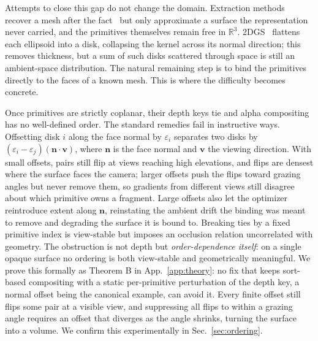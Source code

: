 Attempts to close this gap do not change the domain. Extraction methods recover a mesh after the
fact~\citep{sugar, gaussianSurfels} but only approximate a surface the representation never carried,
and the primitives themselves remain free in $\mathbb{R}^3$.
2DGS~\citep{2DGS} flattens each ellipsoid into a disk, collapsing the kernel across its normal
direction; this removes thickness, but a sum of such disks scattered through space is still an
ambient-space distribution.
The natural remaining step is to bind the primitives directly to the faces of a known mesh. This is
where the difficulty becomes concrete.

Once primitives are strictly coplanar, their depth keys tie and alpha compositing has no
well-defined order. The standard remedies fail in instructive ways.
Offsetting disk $i$ along the face normal by $\varepsilon_i$ separates two disks by
$(\varepsilon_i-\varepsilon_j)(\mathbf{n}\cdot\mathbf{v})$, where $\mathbf{n}$ is the face normal and $\mathbf{v}$ the viewing direction. 
With small offsets, pairs still flip at views reaching high elevations, and flips are densest where
the surface faces the camera; larger offsets push the flips toward grazing angles but never remove
them, so gradients from different views still disagree about which primitive owns a fragment.
Large offsets also let the optimizer reintroduce extent along $\mathbf{n}$, reinstating the ambient
drift the binding was meant to remove and degrading the surface it is bound to.
Breaking ties by a fixed primitive index is view-stable but imposes an occlusion relation
uncorrelated with geometry.
The obstruction is not depth but \emph{order-dependence itself}: on a single opaque surface no
ordering is both view-stable and geometrically meaningful. We prove this formally as Theorem B in
App.~\ref{app:theory}: no fix that keeps sort-based compositing with a static per-primitive
perturbation of the depth key, a normal offset being the canonical example, can avoid it. Every
finite offset still flips some pair at a visible view, and suppressing all flips to within a
grazing angle requires an offset that diverges as the angle shrinks, turning the surface into a
volume. We confirm this experimentally in Sec.~\ref{sec:ordering}.


